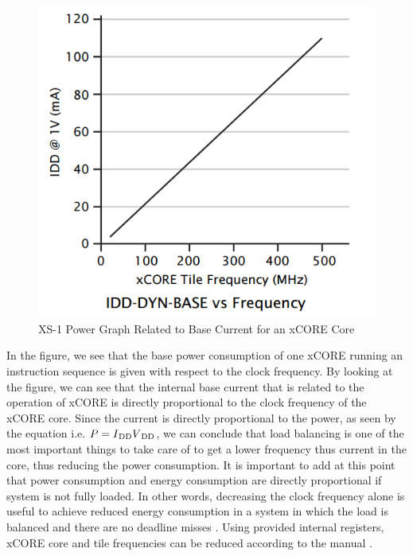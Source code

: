 
\begin{figure}[!ht]
	\centering
	\captionsetup{justification=centering}
	\includegraphics[scale=0.5]{content/images/xs1energy.png}
	\caption{XS-1 Power Graph Related to Base Current for an xCORE Core}
	\label{fig:xs1energy}
\end{figure}

In the figure, we see that the base power consumption of one xCORE running an instruction sequence is given with respect to the clock frequency. By looking at the figure, we can see that the internal base current that is related to the operation of xCORE is directly proportional to the clock frequency of the xCORE core. Since the current is directly proportional to the power, as seen by the equation i.e. $P = {I\textsubscript{DD}}  {V\textsubscript{DD}}$, we can conclude that load balancing is one of the most important things to take care of to get a lower frequency thus current in the core, thus reducing the power consumption. It is important to add at this point that power consumption and energy consumption are directly proportional if system is not fully loaded. In other words, decreasing the clock frequency alone is useful to achieve reduced energy consumption in a system in which the load is balanced and there are no deadline misses \cite{dvfspaper}. Using provided internal registers, xCORE core and tile frequencies can be reduced according to the manual \cite{xs1energymanual}. 


